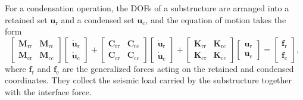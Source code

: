 \documentclass[a4paper,fleqn,review,12pt]{cas-sc}
\numberwithin{equation}{section}
\begin{document}
For a condensation operation, the DOFs of a substructure are arranged into a retained set \(\bm{u}_{\mathrm{r}}\) and a condensed set \(\bm{u}_{\mathrm{c}}\), and the equation of motion takes the form
\begin{equation}
  \begin{bmatrix}
    \mathbf{M}_{\mathrm{rr}} & \mathbf{M}_{\mathrm{rc}}\\
    \mathbf{M}_{\mathrm{cr}} & \mathbf{M}_{\mathrm{cc}}
  \end{bmatrix}
  \begin{bmatrix}
    \ddot{\bm{u}}_{\mathrm{r}}\\
    \ddot{\bm{u}}_{\mathrm{c}}
  \end{bmatrix}
  +
  \begin{bmatrix}
    \mathbf{C}_{\mathrm{rr}} & \mathbf{C}_{\mathrm{rc}}\\
    \mathbf{C}_{\mathrm{cr}} & \mathbf{C}_{\mathrm{cc}}
  \end{bmatrix}
  \begin{bmatrix}
    \dot{\bm{u}}_{\mathrm{r}}\\
    \dot{\bm{u}}_{\mathrm{c}}
  \end{bmatrix}
  +
  \begin{bmatrix}
    \mathbf{K}_{\mathrm{rr}} & \mathbf{K}_{\mathrm{rc}}\\
    \mathbf{K}_{\mathrm{cr}} & \mathbf{K}_{\mathrm{cc}}
  \end{bmatrix}
  \begin{bmatrix}
    \bm{u}_{\mathrm{r}}\\
    \bm{u}_{\mathrm{c}}
  \end{bmatrix}
  =
  \begin{bmatrix}
    \bm{f}_{\mathrm{r}}\\
    \bm{f}_{\mathrm{c}}
  \end{bmatrix},
  \label{eq:partitioned-local-eom}
\end{equation}
where \(\bm{f}_{\mathrm{r}}\) and \(\bm{f}_{\mathrm{c}}\) are the generalized forces acting on the retained and condensed coordinates. They collect the seismic load carried by the substructure together with the interface force.
\end{document}
